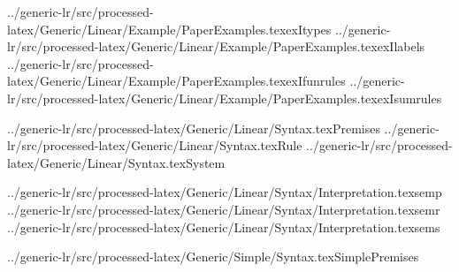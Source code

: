 \def\prefix{../generic-lr/src/processed-latex}

\CatchFileBetweenTags{\exItypes}%
{\prefix/Generic/Linear/Example/PaperExamples.tex}{exItypes}
\CatchFileBetweenTags{\exIlabels}%
{\prefix/Generic/Linear/Example/PaperExamples.tex}{exIlabels}
\CatchFileBetweenTags{\exIfunrules}%
{\prefix/Generic/Linear/Example/PaperExamples.tex}{exIfunrules}
\CatchFileBetweenTags{\exIsumrules}%
{\prefix/Generic/Linear/Example/PaperExamples.tex}{exIsumrules}

\CatchFileBetweenTags{\Premises}%
{\prefix/Generic/Linear/Syntax.tex}{Premises}
\CatchFileBetweenTags{\Rule}%
{\prefix/Generic/Linear/Syntax.tex}{Rule}
\CatchFileBetweenTags{\System}%
{\prefix/Generic/Linear/Syntax.tex}{System}

\CatchFileBetweenTags{\semp}%
{\prefix/Generic/Linear/Syntax/Interpretation.tex}{semp}
\CatchFileBetweenTags{\semr}%
{\prefix/Generic/Linear/Syntax/Interpretation.tex}{semr}
\CatchFileBetweenTags{\sems}%
{\prefix/Generic/Linear/Syntax/Interpretation.tex}{sems}

\CatchFileBetweenTags{\SimplePremises}%
{\prefix/Generic/Simple/Syntax.tex}{SimplePremises}
